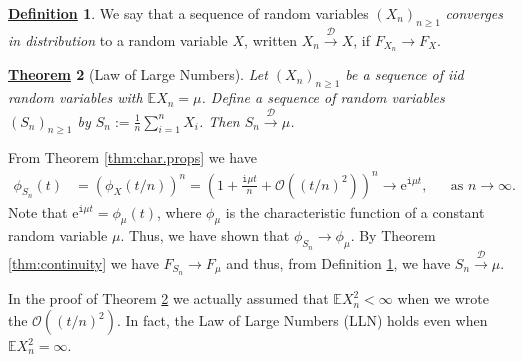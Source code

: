 \documentclass[12pt]{book}
\numberwithin{equation}{chapter}
\theoremstyle{plain}
\newtheorem{theorem}{\underline{Theorem}}
\numberwithin{theorem}{section}
\theoremstyle{definition}
\newtheorem{definition}[theorem]{\underline{Definition}}
\numberwithin{exercise}{chapter}
\let\oldendproof\endproof
\renewenvironment{proof}[1][\proofname]{%
  \oldproof[\scshape\underline{#1}]%
}{\oldendproof}
\newcommand{\<}{\langle}
\renewcommand{\>}{\rangle}
\renewcommand{\(}{\left(}
\renewcommand{\)}{\right)}
\renewcommand{\[}{\left[}
\renewcommand{\]}{\right]}
\newcommand\Eb{\mathds{E}}
\newcommand\Dc{\mathscr{D}}
\newcommand\Oc{\mathscr{O}}
\newcommand\ii{\mathtt{i}}
\newcommand\ee{\mathrm{e}}
\begin{document}
\begin{definition}
\label{def:D.convergence}
We say that a sequence of random variables $(X_n)_{n \geq 1}$ \emph{converges in distribution} to a random variable $X$, written $X_n \stackrel{\Dc}{\to} X$, if $F_{X_n} \to F_X$.
\end{definition}

\begin{theorem}[Law of Large Numbers]
\label{thm:lln}
Let $(X_n)_{n \geq 1}$ be a sequence of iid random variables with $\Eb X_n = \mu$.  
Define a sequence of random variables $(S_n)_{n \geq 1}$ by $S_n := \frac{1}{n}\sum_{i=1}^n X_i$.  Then $S_n \stackrel{\Dc}{\to} \mu$.
\end{theorem}
\begin{proof}
From Theorem \ref{thm:char.props} we have
\begin{align}
\phi_{S_n}(t)
	&=	\( \phi_X(t/n) \)^n
	=		\( 1 + \frac{\ii \mu t}{n} + \Oc((t/n)^2) \)^n
	\to		\ee^{\ii \mu t} , &
	&\text{as $n\to  \infty$} .
\end{align}
Note that $\ee^{\ii \mu t} = \phi_\mu(t)$, where $\phi_\mu$ is the characteristic function of a constant random variable $\mu$.
Thus, we have shown that $\phi_{S_n} \to \phi_\mu$.  By Theorem \ref{thm:continuity} we have $F_{S_n} \to F_\mu$ and thus, from Definition \ref{def:D.convergence}, we have $S_n \stackrel{\Dc}{\to} \mu$.
\end{proof}

\noindent
In the proof of Theorem \ref{thm:lln} we actually assumed that $\Eb X_n^2 < \infty$ when we wrote the $\Oc((t/n)^2)$.  In fact, the Law of Large Numbers (LLN) holds even when $\Eb X_n^2 = \infty$.
\end{document}
